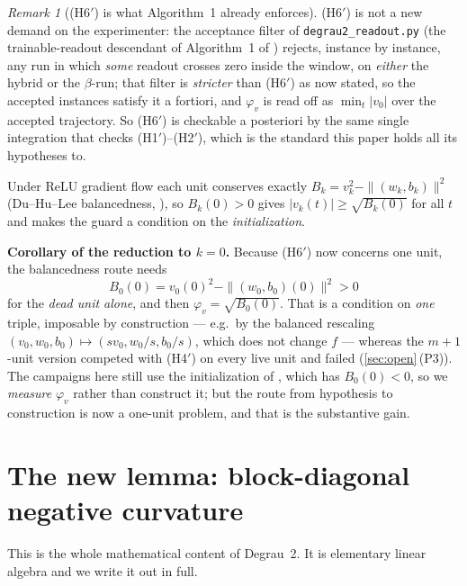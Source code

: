 \documentclass[11pt]{article}
\theoremstyle{remark}
\newtheorem{remark}[theorem]{Remark}
\newcommand{\hyplabel}[1]{\textup{(#1)}}
\begin{document}
\begin{remark}[\hyplabel{H6$'$} is what Algorithm~1 already enforces]
\hyplabel{H6$'$} is not a new demand on the experimenter: the acceptance filter
of \texttt{degrau2\_readout.py} (the trainable-readout descendant of
Algorithm~1 of \cite{paper}) rejects, instance by instance, any run in which
\emph{some} readout crosses zero inside the window, on \emph{either} the hybrid
or the $\beta$-run; that filter is \emph{stricter} than \hyplabel{H6$'$} as now
stated, so the accepted instances satisfy it a fortiori, and $\varphi_v$ is read
off as $\min_t|v_0|$ over the accepted trajectory. So \hyplabel{H6$'$} is checkable a posteriori by the same
single integration that checks \hyplabel{H1$'$}--\hyplabel{H2$'$}, which is the
standard this paper holds all its hypotheses to.

Under ReLU gradient flow each unit conserves exactly
$B_k=v_k^2-\|(w_k,b_k)\|^2$ (Du--Hu--Lee balancedness, \cite{duhulee}), so
$B_k(0)>0$ gives $|v_k(t)|\ge\sqrt{B_k(0)}$ for all $t$ and makes the guard a
condition on the \emph{initialization}.

\textbf{Corollary of the reduction to $k=0$.} Because \hyplabel{H6$'$} now
concerns one unit, the balancedness route needs
\[
B_0(0)=v_0(0)^2-\|(w_0,b_0)(0)\|^2>0
\]
for the \emph{dead unit alone}, and then $\varphi_v=\sqrt{B_0(0)}$. That is a
condition on \emph{one} triple, imposable by construction --- e.g.\ by the
balanced rescaling $(v_0,w_0,b_0)\mapsto(sv_0,w_0/s,b_0/s)$, which does not
change $f$ --- whereas the $m+1$-unit version competed with \hyplabel{H4$'$} on
every live unit and failed (\cref{sec:open}\,(P3)). The campaigns here still use
the initialization of \cite{paper}, which has $B_0(0)<0$, so we \emph{measure}
$\varphi_v$ rather than construct it; but the route from hypothesis to
construction is now a one-unit problem, and that is the substantive gain.
\end{remark}

\section{The new lemma: block-diagonal negative curvature}\label{sec:lema}

This is the whole mathematical content of Degrau~2. It is elementary linear
algebra and we write it out in full.
\end{document}
